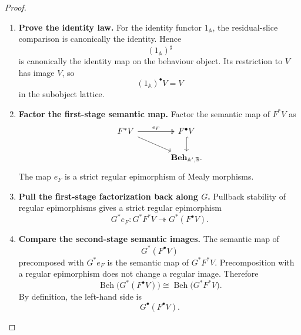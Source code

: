 \begin{proof}
\begin{enumerate}
        \item \textbf{Prove the identity law.}
        For the identity functor \(1_{\mathbb A}\), the residual-slice
        comparison is canonically the identity. Hence
        \[
            (1_{\mathbb A})^\sharp
        \]
        is canonically the identity map on the behaviour object. Its
        restriction to \(V\) has image \(V\), so
        \[
            (1_{\mathbb A})^\bullet V=V
        \]
        in the subobject lattice.

        \item \textbf{Factor the first-stage semantic map.}
        Factor the semantic map of \(F^*V\) as
        \[
        \begin{tikzcd}[column sep=large]
            F^*V
                \arrow[r, two heads, "e_F"]
                \arrow[dr]
            &
            F^\bullet V
                \arrow[d, hook]
            \\
            &
            \mathbf{Beh}_{\mathbb A',\mathbb B}.
        \end{tikzcd}
        \]
        The map \(e_F\) is a strict regular epimorphism of Mealy morphisms.

        \item \textbf{Pull the first-stage factorization back along \(G\).}
        Pullback stability of regular epimorphisms gives a strict regular
        epimorphism
        \[
            G^*e_F:
            G^*F^*V
            \twoheadrightarrow
            G^*(F^\bullet V).
        \]

        \item \textbf{Compare the second-stage semantic images.}
        The semantic map of
        \[
            G^*(F^\bullet V)
        \]
        precomposed with \(G^*e_F\) is the semantic map of \(G^*F^*V\).
        Precomposition with a regular epimorphism does not change a regular
        image. Therefore
        \[
            \operatorname{Beh}
            \bigl(
                G^*(F^\bullet V)
            \bigr)
            \cong
            \operatorname{Beh}
            \bigl(
                G^*F^*V
            \bigr).
        \]
        By definition, the left-hand side is
        \[
            G^\bullet(F^\bullet V).
        \]


\end{enumerate}
\end{proof}
